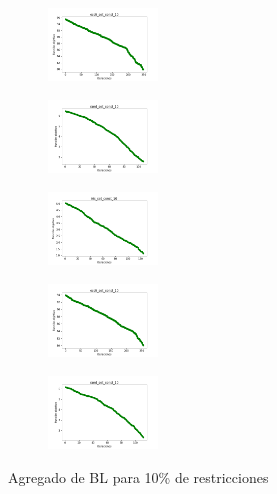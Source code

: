 \begin{figure}[H]
\begin{subfigure}
    \end{subfigure}
    \hfill
    \begin{subfigure}
        \centering
        \includegraphics[width=0.32\textwidth]{img/bl/ecoli_set_const_10_49258669_cost.png}
    \end{subfigure}
    \hfill
    \begin{subfigure}
        \centering
        \includegraphics[width=0.32\textwidth]{img/bl/rand_set_const_10_49258669_cost.png}
    \end{subfigure}
    \hfill
    \begin{subfigure}
        \centering
        \includegraphics[width=0.32\textwidth]{img/bl/iris_set_const_10_3773969821_cost.png}
    \end{subfigure}
    \hfill
    \begin{subfigure}
        \centering
        \includegraphics[width=0.32\textwidth]{img/bl/ecoli_set_const_10_3773969821_cost.png}
    \end{subfigure}
    \hfill
    \begin{subfigure}
        \centering
        \includegraphics[width=0.32\textwidth]{img/bl/rand_set_const_10_3773969821_cost.png}
    \end{subfigure}
    \caption{Agregado de BL para 10\% de restricciones}
\end{figure}

